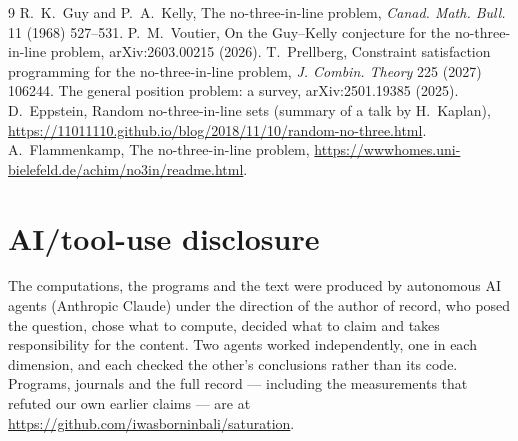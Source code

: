 \documentclass[11pt,a4paper]{article}
\begin{document}
\begin{thebibliography}{9}
 R.~K.~Guy and P.~A.~Kelly, The no-three-in-line problem, \emph{Canad. Math. Bull.} 11 (1968) 527--531.
 P.~M.~Voutier, On the Guy--Kelly conjecture for the no-three-in-line problem, arXiv:2603.00215 (2026).
 T.~Prellberg, Constraint satisfaction programming for the no-three-in-line problem, \emph{J. Combin. Theory} 225 (2027) 106244.
 The general position problem: a survey, arXiv:2501.19385 (2025).
 D.~Eppstein, Random no-three-in-line sets (summary of a talk by H.~Kaplan), \url{https://11011110.github.io/blog/2018/11/10/random-no-three.html}.
 A.~Flammenkamp, The no-three-in-line problem, \url{https://wwwhomes.uni-bielefeld.de/achim/no3in/readme.html}.
\end{thebibliography}

\section*{AI/tool-use disclosure}
The computations, the programs and the text were produced by autonomous AI agents (Anthropic Claude)
under the direction of the author of record, who posed the question, chose what to compute, decided
what to claim and takes responsibility for the content.  Two agents worked independently, one in
each dimension, and each checked the other's conclusions rather than its code.  Programs, journals
and the full record --- including the measurements that refuted our own earlier claims --- are at
\url{https://github.com/iwasborninbali/saturation}.
\end{document}
